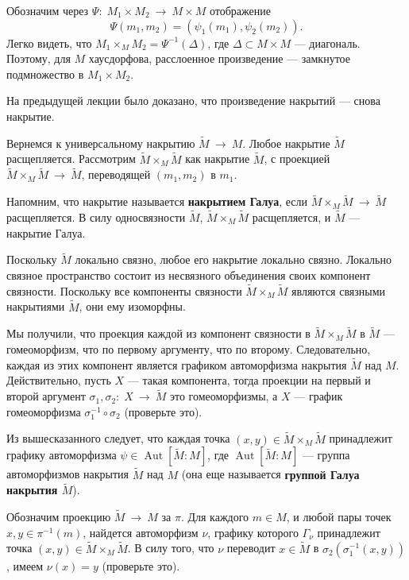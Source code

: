 \documentclass[12pt]{book}
\newcommand{\arrow}{{\:\longrightarrow\:}}
\def\Aut{\operatorname{Aut}}
\theoremstyle{upshape}
\theoremstyle{generic}
\theoremstyle{upshapenonumber}
\newcommand{\следствие}{%
     \refstepcounter{teorema}
     {\noindent\bf Следствие \thechapter.\arabic{teorema}:\ }}
\newcommand{\пример}{%
     \refstepcounter{teorema}
     {\noindent\bf Пример \thechapter.\arabic{teorema}:\ }}
\newcommand{\лемма}{%
     \refstepcounter{teorema}
     {\noindent\bf Лемма \thechapter.\arabic{teorema}:\ }}
\newcommand{\теорема}{%
     \refstepcounter{teorema}
     {\noindent\bf Теорема \thechapter.\arabic{teorema}:\ }}
\newcommand{\утверждение}{%
     \refstepcounter{teorema}
     {\noindent\bf Утверждение \thechapter.\arabic{teorema}:\ }}
\def\бф{\bf}
\begin{document}
Обозначим через $\Psi:\; M_1\times M_2\arrow M\times M$
отображение 
\[ 
  \Psi(m_1, m_2)  =(\psi_1(m_1),\psi_2(m_2)).
\]
Легко видеть, что $M_1\times_M M_2= \Psi^{-1}(\Delta)$,
где $\Delta\subset M\times M$ --- диагональ.
Поэтому, для $M$ хаусдорфова,
расслоенное произведение --- замкнутое подмножество
в $M_1\times M_2$.

На предыдущей лекции было доказано, что
произведение накрытий --- снова накрытие.

Вернемся к универсальному накрытию $\tilde M \arrow M$.
Любое накрытие $\tilde M$ расщепляется. 
Рассмотрим $\tilde M \times_M \tilde M$ как накрытие $\tilde M$,
с проекцией $\tilde M \times_M \tilde M\arrow \tilde M$,
переводящей $(m_1, m_2)$ в $m_1$. 

Напомним, что накрытие называется {\бф накрытием Галуа}, если
$\tilde M \times_M \tilde M\arrow\tilde M$  расщепляется. 
В силу односвязности $\tilde M$, 
$\tilde M \times_M \tilde M$
расщепляется, и $\tilde M$ --- накрытие Галуа.

Поскольку $\tilde M$ локально связно,
любое его накрытие локально связно. Локально
связное пространство состоит из несвязного объединения
своих компонент связности. Поскольку все компоненты
связности $\tilde M \times_M \tilde M$ являются
связными накрытиями $\tilde M$, они ему изоморфны.

Мы получили, что
проекция каждой из компонент связности в $\tilde M \times_M \tilde M$
в $\tilde M$ --- гомеоморфизм, что по первому аргументу,
что по второму. Следовательно, каждая из этих компонент
является графиком автоморфизма накрытия $\tilde M$ над $M$.
Действительно, пусть $X$ --- такая компонента, тогда
проекции на первый и второй аргумент $\sigma_1, \sigma_2:\; X \arrow \tilde M$
это гомеоморфизмы, а $X$ --- график гомеоморфизма
$\sigma_1^{-1} \circ \sigma_2$ (проверьте это).

Из вышесказанного следует, что каждая точка
$(x,y) \in \tilde M \times_M \tilde M$ принадлежит
графику автоморфизма $\psi\in \Aut[\tilde M: M]$,
где $\Aut[\tilde M: M]$ --- группа автоморфизмов
накрытия $\tilde M$ над $M$ (она еще называется
{\бф группой Галуа накрытия $\tilde M$}).

Обозначим проекцию $\tilde M \arrow M$ за $\pi$.
Для каждого $m\in M$, и любой пары точек
$x, y \in \pi^{-1}(m)$, найдется автоморфизм $\nu$, графику
которого $\Gamma_\nu$ принадлежит точка $(x,y)\in \tilde M \times_M\tilde M$. 
В силу того, что $\nu$ переводит $x \in \tilde M$
в $\sigma_2(\sigma_1^{-1}(x,y))$, имеем $\nu(x)=y$
(проверьте это).
\end{document}
